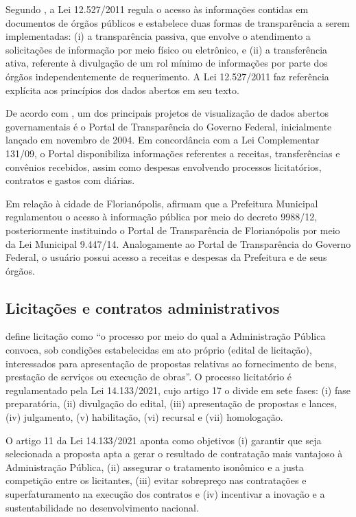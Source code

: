 Segundo \cite{possamai2020transparencia}, a Lei 12.527/2011 regula o acesso às informações contidas em documentos de órgãos públicos e estabelece duas formas de transparência a serem implementadas: (i) a transparência passiva, que envolve o atendimento a solicitações de informação por meio físico ou eletrônico, e (ii) a transferência ativa, referente à divulgação de um rol mínimo de informações por parte dos órgãos independentemente de requerimento. A Lei 12.527/2011 faz referência explícita aos princípios dos dados abertos em seu texto.

De acordo com \cite{nazario2012avaliaccao}, um dos principais projetos de visualização de dados abertos governamentais é o Portal de Transparência do Governo Federal, inicialmente lançado em novembro de 2004. Em concordância com a Lei Complementar 131/09, o Portal disponibiliza informações referentes a receitas, transferências e convênios recebidos, assim como despesas envolvendo processos licitatórios, contratos e gastos com diárias.

Em relação à cidade de Florianópolis, \cite{santos2021ferramenta} afirmam que a Prefeitura Municipal regulamentou o acesso à informação pública por meio do decreto 9988/12, posteriormente instituindo o Portal de Transparência de Florianópolis por meio da Lei Municipal 9.447/14. Analogamente ao Portal de Transparência do Governo Federal, o usuário possui acesso a receitas e despesas da Prefeitura e de seus órgãos.

\subsection{Licitações e contratos administrativos}

\cite{tcu2023} define licitação como “o processo por meio do qual a Administração Pública convoca, sob condições estabelecidas em ato próprio (edital de licitação), interessados para apresentação de propostas relativas ao fornecimento de bens, prestação de serviços ou execução de obras”. O processo licitatório é regulamentado pela Lei 14.133/2021, cujo artigo 17 o divide em sete fases: (i) fase preparatória, (ii) divulgação do edital, (iii) apresentação de propostas e lances, (iv) julgamento, (v) habilitação, (vi) recursal e (vii) homologação.

O artigo 11 da Lei 14.133/2021 aponta como objetivos (i) garantir que seja selecionada a proposta apta a gerar o resultado de contratação mais vantajoso à Administração Pública, (ii) assegurar o tratamento isonômico e a justa competição entre os licitantes, (iii) evitar sobrepreço nas contratações e superfaturamento na execução dos contratos e (iv) incentivar a inovação e a sustentabilidade no desenvolvimento nacional.

